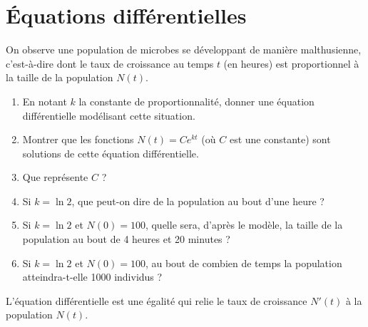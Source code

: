 \documentclass[11pt,class=report,crop=false]{standalone}
\begin{document}

\section*{\'Equations différentielles}



\exercice{}
\enonce
On observe une population de microbes se développant de manière malthusienne, c'est-à-dire 
dont le taux de croissance au temps $t$ (en heures) est proportionnel à la taille de la
population $N(t)$.
    \begin{enumerate}
        \item
        En notant $k$ la constante de proportionnalité, donner une équation différentielle 
        modélisant cette situation.
        \item
        Montrer que les fonctions $N(t) = Ce^{kt}$ (où $C$ est une constante) sont solutions 
        de cette équation différentielle.
        \item
        Que représente $C$ ?
        \item
        Si $k= \ln 2$, que peut-on dire de la population au bout d'une heure ?
        \item
        Si $k = \ln 2$ et $N(0)=100$, quelle sera, d'après le modèle, la taille de la 
        population au bout de 4 heures et 20 minutes ?
        \item
        Si $k = \ln 2$ et $N(0)=100$, au bout de combien de temps la population 
        atteindra-t-elle 1000 individus ?
    \end{enumerate}  
\finenonce

\indication
L'équation différentielle est une égalité qui relie le taux de croissance $N'(t)$ à la population $N(t)$.
\finindication

\correction

\end{document}
